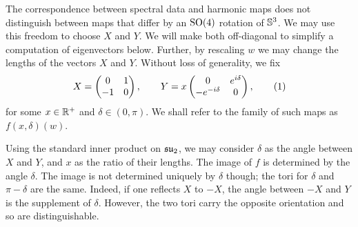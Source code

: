 \documentclass{article}
\begin{document}
The correspondence between spectral data and harmonic maps does not distinguish between maps that differ by an $\SO(4)$ rotation of $\S^3$. We may use this freedom to choose $X$ and $Y$. We will make both off-diagonal to simplify a computation of eigenvectors below. Further, by rescaling $w$ we may change the lengths of the vectors $X$ and $Y$. Without loss of generality, we fix 
\[
X = \begin{pmatrix}
0 & 1 \\ -1 & 0
\end{pmatrix}, \qquad
Y = x\begin{pmatrix}
0 & e^{\iu \delta} \\ -e^{-\iu \delta} & 0
\end{pmatrix},
\labelthis{eqn:def delta}
\]
for some $x \in \R^+$ and $\delta\in (0,\pi)$. We shall refer to the family of such maps as $f(x,\delta)(w)$.


Using the standard inner product on $\su_2$, we may consider $\delta$ as the angle between $X$ and $Y$, and $x$ as the ratio of their lengths. The image of $f$ is determined by the angle $\delta$. The image is not determined uniquely by $\delta$ though; the tori for $\delta$ and $\pi-\delta$ are the same. Indeed, if one reflects $X$ to $-X$, the angle between $-X$ and $Y$ is the supplement of $\delta$. However, the two tori carry the opposite orientation and so are distinguishable.
\end{document}
